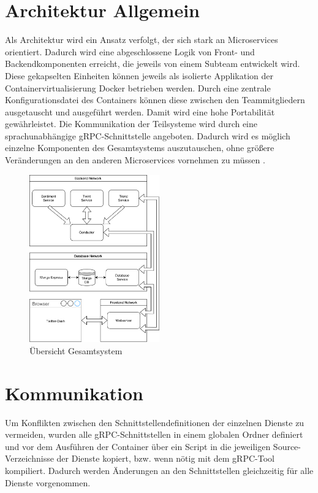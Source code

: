 \documentclass[conference]{IEEEtran}
\begin{document}
\section{Architektur Allgemein}

Als Architektur wird ein Ansatz verfolgt, der sich stark an Microservices orientiert.
Dadurch wird eine abgeschlossene Logik von Front- und Backendkomponenten erreicht, die jeweils
von einem Subteam entwickelt wird. Diese gekapselten Einheiten können jeweils als isolierte Applikation der Containervirtualisierung Docker betrieben werden.
Durch eine zentrale Konfigurationsdatei des Containers können diese zwischen den Teammitgliedern
ausgetauscht und ausgeführt werden. Damit wird eine hohe Portabilität gewährleistet.
Die Kommunikation der Teilsysteme wird durch eine sprachunabhängige gRPC-Schnittstelle angeboten.
Dadurch wird es möglich einzelne Komponenten des Gesamtsystems auszutauschen,
ohne größere Veränderungen an den anderen Microservices vornehmen zu müssen \cite{microservices}.

\begin{figure}
    \includegraphics[width=0.5\textwidth]{Architecture.png}
    \caption{Übersicht Gesamtsystem}
\end{figure}


\section{Kommunikation}
Um Konflikten zwischen den Schnittstellendefinitionen der einzelnen Dienste zu vermeiden,
wurden alle gRPC-Schnittstellen in einem globalen Ordner definiert und vor dem Ausführen der Container über ein Script in die jeweiligen Source-Verzeichnisse der Dienste kopiert, bzw. wenn nötig mit dem gRPC-Tool kompiliert.
Dadurch werden Änderungen an den Schnittstellen gleichzeitig für alle Dienste vorgenommen.
\end{document}
